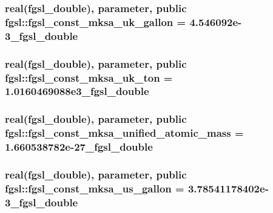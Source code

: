 \hypertarget{classfgsl_a15754665dbe5dc6a4976466a653b27a3}{
\subsubsection[{fgsl\-\_\-const\-\_\-mksa\-\_\-uk\-\_\-gallon}]{\setlength{\rightskip}{0pt plus 5cm}real({\bf fgsl\-\_\-double}), parameter, public fgsl\-::fgsl\-\_\-const\-\_\-mksa\-\_\-uk\-\_\-gallon = 4.\-546092e-\/3\-\_\-fgsl\-\_\-double}}\label{classfgsl_a15754665dbe5dc6a4976466a653b27a3}
\hypertarget{classfgsl_a3eea842ca98526b2c06b85da367b7579}{
\subsubsection[{fgsl\-\_\-const\-\_\-mksa\-\_\-uk\-\_\-ton}]{\setlength{\rightskip}{0pt plus 5cm}real({\bf fgsl\-\_\-double}), parameter, public fgsl\-::fgsl\-\_\-const\-\_\-mksa\-\_\-uk\-\_\-ton = 1.\-0160469088e3\-\_\-fgsl\-\_\-double}}\label{classfgsl_a3eea842ca98526b2c06b85da367b7579}
\hypertarget{classfgsl_a0e18a0c505ad7f70865f8d0351dbec24}{
\subsubsection[{fgsl\-\_\-const\-\_\-mksa\-\_\-unified\-\_\-atomic\-\_\-mass}]{\setlength{\rightskip}{0pt plus 5cm}real({\bf fgsl\-\_\-double}), parameter, public fgsl\-::fgsl\-\_\-const\-\_\-mksa\-\_\-unified\-\_\-atomic\-\_\-mass = 1.\-660538782e-\/27\-\_\-fgsl\-\_\-double}}\label{classfgsl_a0e18a0c505ad7f70865f8d0351dbec24}
\hypertarget{classfgsl_a9c8e297dc4a0fa63d97e1c130cc5248a}{
\subsubsection[{fgsl\-\_\-const\-\_\-mksa\-\_\-us\-\_\-gallon}]{\setlength{\rightskip}{0pt plus 5cm}real({\bf fgsl\-\_\-double}), parameter, public fgsl\-::fgsl\-\_\-const\-\_\-mksa\-\_\-us\-\_\-gallon = 3.\-78541178402e-\/3\-\_\-fgsl\-\_\-double}}\label{classfgsl_a9c8e297dc4a0fa63d97e1c130cc5248a}
